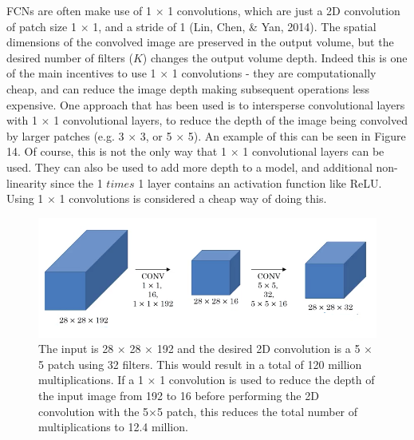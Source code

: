 \documentclass[a4paper]{article}
\begin{document}
FCNs are often make use of 1 $\times$ 1 convolutions, which are just a 2D convolution of patch size 1 $\times$ 1, and a stride of 1 (Lin, Chen, \& Yan, 2014). The spatial dimensions of the convolved image are preserved in the output volume, but the desired number of filters ($K$) changes the output volume depth. Indeed this is one of the main incentives to use 1 $\times$ 1 convolutions - they are computationally cheap, and can reduce the image depth making subsequent operations less expensive. One approach that has been used is to intersperse convolutional layers with 1 $\times$ 1 convolutional layers, to reduce the depth of the image being convolved by larger patches (e.g. 3 $\times$ 3, or 5 $\times$ 5). An example of this can be seen in Figure 14. Of course, this is not the only way that 1 $\times$ 1 convolutional layers can be used. They can also be used to add more depth to a model, and additional non-linearity since the 1 $times$ 1 layer contains an activation function like ReLU. Using 1 $\times$ 1 convolutions is considered a cheap way of doing this.  
\begin{figure}[h]
\centering
\includegraphics[scale=0.4]{1by1}
\caption{The input is 28 $\times$ 28 $\times$ 192 and the desired 2D convolution is a 5 $\times$ 5 patch using 32 filters. This would result in a total of 120 million multiplications. If a 1 $\times$ 1 convolution is used to reduce the depth of the input image from 192 to 16 before performing the 2D convolution with the 5$\times$5 patch, this reduces the total number of multiplications to 12.4 million.}
\end{figure}
\end{document}
